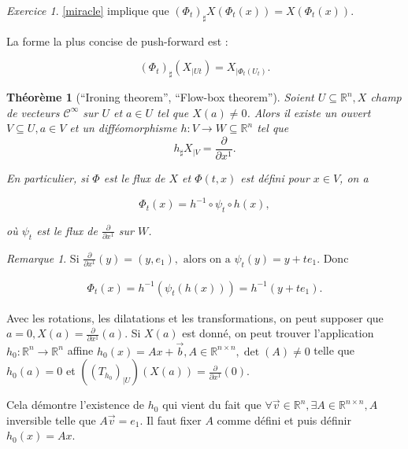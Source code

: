 \documentclass[french]{article}
\newtheorem{prototheorem}{Théorème}[section]
\newenvironment{thm}
   {\colorlet{shadecolor}{orange!10}\begin{shaded}\begin{prototheorem}}
   {\end{prototheorem}\end{shaded}}
\theoremstyle{definition}
\theoremstyle{remark}
\newtheorem*{remark}{Remarque}
\newtheorem{exo}{Exercice}
\begin{document}

\begin{exo}
  \ref{miracle} implique que \((\Phi_t)_{\sharp}X(\Phi_t(x)) = X(\Phi_t(x))\).
\end{exo}

La forme la plus concise de push-forward est :

\begin{equation*}
  (\Phi_t)_{\sharp}(X _{\mid Ut}) = X _{\mid \Phi_t(U_t)}.
\end{equation*}

\begin{thm}[``Ironing theorem'', ``Flow-box theorem'']
  Soient \(U \subseteq \mathbb{R}^n, X\) champ de vecteurs \(\mathcal{C}^\infty\) sur \(U\) et \(a \in U\) tel que \(X(a) \neq 0\). Alors il existe un ouvert \(V \subseteq U, a \in V\) et un difféomorphisme \(h : V \longrightarrow W \subseteq \mathbb{R}^n\) tel que \[h _{\sharp}X _{\mid V} = \displaystyle\frac{\partial  }{\partial x ^{1}}.\]

  En particulier, si \(\Phi\) est le flux de \(X\) et \(\Phi(t,x)\) est défini pour \(x \in V\), on a

  \[\Phi_t(x) = h ^{-1} \circ \psi_t \circ h(x),\]

  où \(\psi_t\) est le flux de \(\displaystyle \frac{\partial  }{\partial x ^{1}}\) sur \(W\).
\end{thm}


\begin{remark}
  Si \(\displaystyle\frac{\partial  }{\partial x ^{1}}(y) = (y,e_1), \text{ alors on a }  \psi_t(y) = y + t e_1\). Donc

  \begin{gather*}
    \Phi_t(x) = h ^{-1}(\psi_t(h(x))) = h ^{-1}(y + t e_1).
  \end{gather*}
\end{remark}

Avec les rotations, les dilatations et les transformations, on peut supposer que \(a = 0, X(a) = \displaystyle \frac{\partial  }{\partial x ^{1}}(a)\). Si \(X(a)\) est donné, on peut trouver l'application \(h_0 : \mathbb{R}^n \longrightarrow \mathbb{R}^n\) affine \(h_0(x) = A x + \overrightarrow{b}, A \in \mathbb{R}^{n \times n}, \operatorname{det}(A) \neq 0\) telle que \(h_0(a) = 0\) et
\(((T _{h_0})_{\mid U})(X(a)) = \displaystyle \frac{\partial  }{\partial x ^{1}}(0)\).

Cela démontre l'existence de \(h_0\) qui vient du fait que \(\forall \overrightarrow{v} \in \mathbb{R}^n, \exists A \in \mathbb{R}^{n \times n}, A\) inversible telle que \(A \overrightarrow{v} = e_1\). Il faut fixer \(A\) comme défini et puis définir \(h_0(x)=Ax\).
\end{document}
